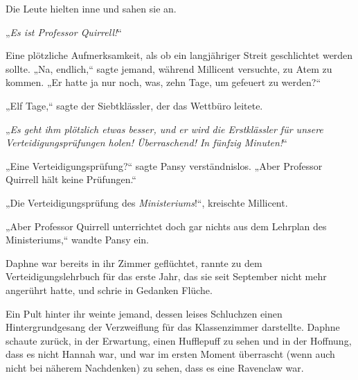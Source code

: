 Die Leute hielten inne und sahen sie an.

„\emph{Es ist Professor Quirrell!}“

Eine plötzliche Aufmerksamkeit, als ob ein langjähriger Streit geschlichtet werden sollte.
„Na, endlich,“ sagte jemand, während Millicent versuchte, zu Atem zu kommen. „Er hatte ja nur noch, was, zehn Tage, um gefeuert zu werden?“

„Elf Tage,“ sagte der Siebtklässler, der das Wettbüro leitete.

„\emph{Es geht ihm plötzlich etwas besser, und er wird die Erstklässler für unsere Verteidigungsprüfungen holen! Überraschend! In fünfzig Minuten!}“

„Eine Verteidigungsprüfung?“ sagte Pansy verständnislos. „Aber Professor Quirrell hält keine Prüfungen.“

„Die Verteidigungsprüfung des \emph{Ministeriums}!“, kreischte Millicent.

„Aber Professor Quirrell unterrichtet doch gar nichts aus dem Lehrplan des Ministeriums,“ wandte Pansy ein.

Daphne war bereits in ihr Zimmer geflüchtet, rannte zu dem Verteidigungslehrbuch für das erste Jahr, das sie seit September nicht mehr angerührt hatte, und schrie in Gedanken Flüche.

\later

Ein Pult hinter ihr weinte jemand, dessen leises Schluchzen einen Hintergrundgesang der Verzweiflung für das Klassenzimmer darstellte. Daphne schaute zurück, in der Erwartung, einen Hufflepuff zu sehen und in der Hoffnung, dass es nicht Hannah war, und war im ersten Moment überrascht (wenn auch nicht bei näherem Nachdenken) zu sehen, dass es eine Ravenclaw war.

